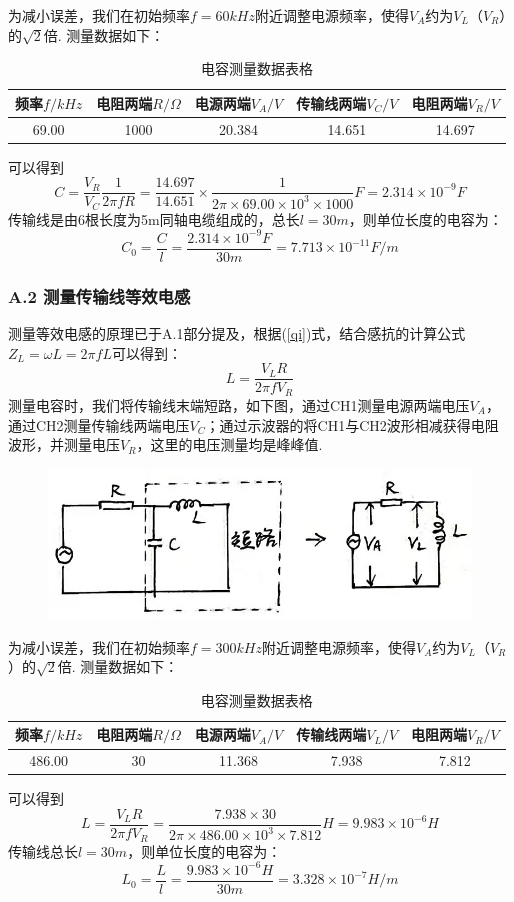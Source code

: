 \documentclass[UTF8]{ctexart}
\begin{document}
 为减小误差，我们在初始频率$f=60kHz$附近调整电源频率，使得$V_A$约为$V_L$（$V_R$）的$\sqrt{2}$倍. 测量数据如下：

 \begin{table}[H]
    \centering
\begin{tabular}{|c|c|c|c|c|}
        \hline
        频率$f/kHz$&电阻两端$R/\Omega$&电源两端$V_A/V$&传输线两端$V_C/V$&电阻两端$V_R/V$\\
        \hline
        69.00&1000&20.384&14.651&14.697\\
        \hline
    \end{tabular}  
    \caption{电容测量数据表格} 
\end{table}
可以得到
\[C=\frac{V_R}{V_C}\frac{1}{2\pi fR}=\frac{14.697}{14.651}\times \frac{1}{2\pi\times 69.00\times 10^3\times 1000}F=2.314\times 10^{-9}F\]
传输线是由6根长度为5m同轴电缆组成的，总长$l=30m$，则单位长度的电容为：
\[C_0=\frac{C}{l}=\frac{2.314\times 10^{-9}F}{30m}=7.713\times 10^{-11}F/m\]
\subsubsection*{A.2 测量传输线等效电感}
测量等效电感的原理已于A.1部分提及，根据(\ref{qi})式，结合感抗的计算公式$Z_L=\omega L=2\pi f L$可以得到：
\begin{equation}
    L=\frac{V_LR}{2\pi fV_R}
\end{equation}
测量电容时，我们将传输线末端短路，如下图，通过CH1测量电源两端电压$V_A$，通过CH2测量传输线两端电压$V_C$；通过示波器的将CH1与CH2波形相减获得电阻波形，并测量电压$V_R$，这里的电压测量均是峰峰值. 
\begin{figure}[H]\begin{center}
    \includegraphics[scale=0.6]{13.PNG}
\end{center}\end{figure}
为减小误差，我们在初始频率$f=300kHz$附近调整电源频率，使得$V_A$约为$V_L$（$V_R$）的$\sqrt{2}$倍. 测量数据如下：
\begin{table}[H]
   \centering
\begin{tabular}{|c|c|c|c|c|}
       \hline
       频率$f/kHz$&电阻两端$R/\Omega$&电源两端$V_A/V$&传输线两端$V_L/V$&电阻两端$V_R/V$\\
       \hline
       486.00&30&11.368&7.938&7.812\\
       \hline
   \end{tabular}  
   \caption{电容测量数据表格} 
\end{table}
可以得到
\[L=\frac{V_LR}{2\pi fV_R}=\frac{7.938\times 30}{2\pi\times486.00\times 10^3\times 7.812}H=9.983\times 10^{-6}H\]
传输线总长$l=30m$，则单位长度的电容为：
\[L_0=\frac{L}{l}=\frac{9.983\times 10^{-6}H}{30m}=3.328\times 10^{-7}H/m\]
\end{document}
